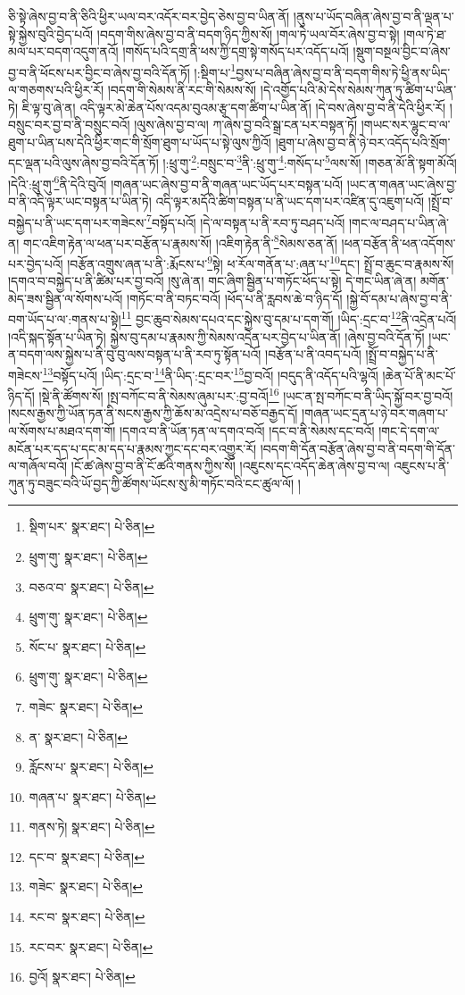 ཅི་སྟེ་ཞེས་བྱ་བ་ནི་ཅིའི་ཕྱིར་ཡལ་བར་འདོར་བར་བྱེད་ཅེས་བྱ་བ་ཡིན་ནོ། །ནུས་པ་ཡོད་བཞིན་ཞེས་བྱ་བ་ནི་ལྡན་པ་སྟེ་སྐྱེས་བུའི་བྱེད་པའོ། །བདག་གིས་ཞེས་བྱ་བ་ནི་བདག་ཉིད་ཀྱིས་སོ། །གལ་ཏེ་ཡལ་བོར་ཞེས་བྱ་བ་སྟེ། །གལ་ཏེ་ཐ་མལ་པར་བདག་འདུག་ནའོ། །གསོད་པའི་དགྲ་ནི་ཕས་ཀྱི་དགྲ་སྟེ་གསོད་པར་འདོད་པའོ། །སྡུག་བསྔལ་བྱིང་བ་ཞེས་བྱ་བ་ནི་ཕོངས་པར་བྱིང་བ་ཞེས་བྱ་བའི་དོན་ཏོ། །:སྡིག་པ་\footnote{སྡིག་པར་  སྣར་ཐང་།  པེ་ཅིན། }བྱས་པ་བཞིན་ཞེས་བྱ་བ་ནི་བདག་གིས་ཏེ་ཕྱི་ནས་ཡིད་ལ་གཅགས་པའི་ཕྱིར་རོ། །བདག་གི་སེམས་ནི་རང་གི་སེམས་སོ། །དེ་འགྱོད་པའི་མེ་དེས་སེམས་ཀུན་ཏུ་ཚིག་པ་ཡིན་ཏེ། ཇི་ལྟ་བུ་ཞེ་ན། འདི་ལྟར་མེ་ཆེན་པོས་འདམ་བུའམ་རྩྭ་དག་ཚིག་པ་ཡིན་ནོ། །དེ་བས་ཞེས་བྱ་བ་ནི་དེའི་ཕྱིར་རོ། །བསྲུང་བར་བྱ་བ་ནི་བསྲུང་བའོ། །ལུས་ཞེས་བྱ་བ་ལ། ཀ་ཞེས་བྱ་བའི་སྒྲ་ངན་པར་བསྟན་ཏོ། །གཡང་སར་ལྷུང་བ་ལ་ཐུག་པ་ཡིན་པས་དེའི་ཕྱིར་གང་གི་སྲོག་ཐུག་པ་ཡོད་པ་སྟེ་ལུས་ཀྱིའོ། །ཐུག་པ་ཞེས་བྱ་བ་ནི་ཉེ་བར་འདོད་པའི་སྲོག་དང་ལྡན་པའི་ལུས་ཞེས་བྱ་བའི་དོན་ཏོ། །:ཕྲུ་གུ་\footnote{ཕྲུག་གུ་  སྣར་ཐང་།  པེ་ཅིན། }:བསྲུང་བ་\footnote{བཅའ་བ་  སྣར་ཐང་།  པེ་ཅིན། }ནི་:ཕྲུ་གུ་\footnote{ཕྲུག་གུ་  སྣར་ཐང་།  པེ་ཅིན། }:གསོད་པ་\footnote{སོང་པ་  སྣར་ཐང་།  པེ་ཅིན། }ལས་སོ། །གཅན་མོ་ནི་སྟག་མོའོ། །དེའི་:ཕྲུ་གུ་\footnote{ཕྲུག་གུ་  སྣར་ཐང་།  པེ་ཅིན། }ནི་དེའི་བུའོ། །གཞན་ཡང་ཞེས་བྱ་བ་ནི་གཞན་ཡང་ཡོད་པར་བསྟན་པའོ། །ཡང་ན་གཞན་ཡང་ཞེས་བྱ་བ་ནི་འདི་ལྟར་ཡང་བསྟན་པ་ཡིན་ཏེ། འདི་ལྟར་མདོའི་ཚིག་བསྟན་པ་ནི་ཡང་དག་པར་འཛིན་དུ་འཇུག་པའོ། །སྤྲོ་བ་བསྐྱེད་པ་ནི་ཡང་དག་པར་གཟེངས་\footnote{གཟེང་  སྣར་ཐང་།  པེ་ཅིན། }བསྟོད་པའོ། །དེ་ལ་བསྟན་པ་ནི་རབ་ཏུ་བཤད་པའོ། །གང་ལ་བཤད་པ་ཡིན་ཞེ་ན། གང་འཇིག་རྟེན་ལ་ཕན་པར་བརྩོན་པ་རྣམས་སོ། །འཇིག་རྟེན་ནི་\footnote{ན་  སྣར་ཐང་།  པེ་ཅིན། }སེམས་ཅན་ནོ། །ཕན་བརྩོན་ནི་ཕན་འདོགས་པར་བྱེད་པའོ། །བརྩོན་འགྲུས་ཞན་པ་ནི་:རྨོངས་པ་\footnote{རློངས་པ་  སྣར་ཐང་།  པེ་ཅིན། }སྟེ། ཕ་རོལ་གནོན་པ་:ཞན་པ་\footnote{གཞན་པ་  སྣར་ཐང་།  པེ་ཅིན། }དང་། སྤྲོ་བ་ཆུང་བ་རྣམས་སོ། །དགའ་བ་བསྐྱེད་པ་ནི་ཚིམ་པར་བྱ་བའོ། །སུ་ཞེ་ན། གང་ཞིག་སྦྱིན་པ་གཏོང་ཕོད་པ་སྟེ། དེ་གང་ཡིན་ཞེ་ན། མགོན་མེད་ཟས་སྦྱིན་ལ་སོགས་པའོ། །གཏོང་བ་ནི་བཏང་བའོ། །ཕོད་པ་ནི་རླབས་ཆེ་བ་ཉིད་དོ། །སྐྱེ་བོ་དམ་པ་ཞེས་བྱ་བ་ནི་བག་ཡོད་པ་ལ་:གནས་པ་སྟེ།\footnote{གནས་ཏེ།  སྣར་ཐང་།  པེ་ཅིན། } བྱང་ཆུབ་སེམས་དཔའ་དང་སྐྱེས་བུ་དམ་པ་དག་གོ། །ཡིད་:དྲང་བ་\footnote{དང་བ་  སྣར་ཐང་།  པེ་ཅིན། }ནི་འདྲེན་པའོ། །འདི་སྐད་སྟོན་པ་ཡིན་ཏེ། སྐྱེས་བུ་དམ་པ་རྣམས་ཀྱི་སེམས་འདྲེན་པར་བྱེད་པ་ཡིན་ནོ། །ཞེས་བྱ་བའི་དོན་ཏོ། །ཡང་ན་བདག་ལས་སྐྱེས་པ་ནི་བུ་བུ་ལས་བསྟན་པ་ནི་རབ་ཏུ་སྟོན་པའོ། །བརྩོན་པ་ནི་འབད་པའོ། །སྤྲོ་བ་བསྐྱེད་པ་ནི་གཟེངས་\footnote{གཟེང་  སྣར་ཐང་།  པེ་ཅིན། }བསྟོད་པའོ། །ཡིད་:དྲང་བ་\footnote{རང་བ་  སྣར་ཐང་།  པེ་ཅིན། }ནི་ཡིད་:དྲང་བར་\footnote{རང་བར་  སྣར་ཐང་།  པེ་ཅིན། }བྱ་བའོ། །བདུད་ནི་འདོད་པའི་ལྷའོ། །ཆེན་པོ་ནི་མང་པོ་ཉིད་དོ། །སྡེ་ནི་ཚོགས་སོ། །སྤ་བཀོང་བ་ནི་སེམས་ཞུམ་པར་:བྱ་བའོ།\footnote{བྱའོ།  སྣར་ཐང་།  པེ་ཅིན། } །ཡང་ན་སྤ་བཀོང་བ་ནི་ཡིད་སྐྱོ་བར་བྱ་བའོ། །སངས་རྒྱས་ཀྱི་ཡོན་ཏན་ནི་སངས་རྒྱས་ཀྱི་ཆོས་མ་འདྲེས་པ་བཅོ་བརྒྱད་དོ། །གཞན་ཡང་དྲན་པ་ཉེ་བར་གཞག་པ་ལ་སོགས་པ་མཐའ་དག་གོ། །དགའ་བ་ནི་ཡོན་ཏན་ལ་དགའ་བའོ། །དང་བ་ནི་སེམས་དང་བའོ། །གང་དེ་དག་ལ་མངོན་པར་དད་པ་དང་མ་དད་པ་རྣམས་ཀྱང་དང་བར་འགྱུར་རོ། །བདག་གི་དོན་བརྩོན་ཞེས་བྱ་བ་ནི་བདག་གི་དོན་ལ་གཞོལ་བའོ། །ངོ་ཚ་ཞེས་བྱ་བ་ནི་ངོ་ཚའི་གནས་ཀྱིས་སོ། །འཇུངས་དང་འདོད་ཆེན་ཞེས་བྱ་བ་ལ། འཇུངས་པ་ནི་ཀུན་ཏུ་བཟུང་བའི་ཡོ་བྱད་ཀྱི་ཚོགས་ཡོངས་སུ་མི་གཏོང་བའི་ངང་ཚུལ་ལོ། །

